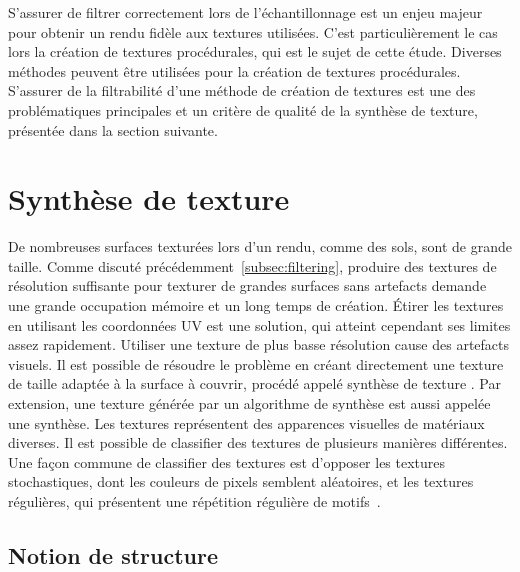 S'assurer de filtrer correctement lors de l'échantillonnage est un enjeu majeur pour obtenir un rendu fidèle aux textures utilisées. C'est particulièrement le cas lors la création de textures procédurales, qui est le sujet de cette étude. Diverses méthodes peuvent être utilisées pour la création de textures procédurales. S'assurer de la filtrabilité d'une méthode de création de textures est une des problématiques principales et un critère de qualité de la synthèse de texture, présentée dans la section suivante.


\section{Synthèse de texture}

De nombreuses surfaces texturées lors d'un rendu, comme des sols, sont de grande taille. Comme discuté précédemment~\ref{subsec:filtering}, produire des textures de résolution suffisante pour texturer de grandes surfaces sans artefacts demande une grande occupation mémoire et un long temps de création. Étirer les textures en utilisant les coordonnées UV est une solution, qui atteint cependant ses limites assez rapidement. Utiliser une texture de plus basse résolution cause des artefacts visuels. Il est possible de résoudre le problème en créant directement une texture de taille adaptée à la surface à couvrir, procédé appelé \og synthèse de texture \fg. Par extension, une texture générée par un algorithme de synthèse est aussi appelée une synthèse. Les textures représentent des apparences visuelles de matériaux diverses. Il est possible de classifier des textures de plusieurs manières différentes. Une façon commune de classifier des textures est d'opposer les textures stochastiques, dont les couleurs de pixels semblent aléatoires, et les textures régulières, qui présentent une répétition régulière de motifs~\cite{liu_near-regular_2004}.

\subsection*{Notion de structure}
\label{subsec:structure}

